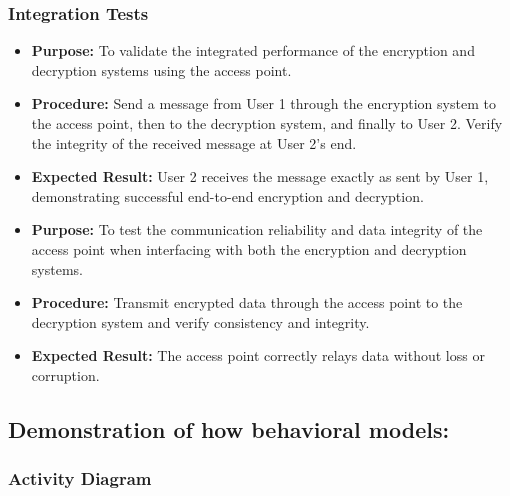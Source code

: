 \documentclass[12pt]{article}
\begin{document}
	\subsubsection*{Integration Tests}
	
	\begin{itemize}
		\item \textbf{Purpose:} To validate the integrated performance of the encryption and decryption systems using the access point.
		\item \textbf{Procedure:} Send a message from User 1 through the encryption system to the access point, then to the decryption system, and finally to User 2. Verify the integrity of the received message at User 2's end.
		\item \textbf{Expected Result:} User 2 receives the message exactly as sent by User 1, demonstrating successful end-to-end encryption and decryption.
	\end{itemize}
	
	\begin{itemize}
		\item \textbf{Purpose:} To test the communication reliability and data integrity of the access point when interfacing with both the encryption and decryption systems.
		\item \textbf{Procedure:} Transmit encrypted data through the access point to the decryption system and verify consistency and integrity.
		\item \textbf{Expected Result:} The access point correctly relays data without loss or corruption.
	\end{itemize}
	
	\newpage
	\subsection{Demonstration of how behavioral models:}
	
	\subsubsection{Activity Diagram}
	
\end{document}
